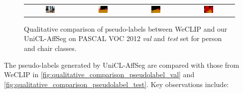 \begin{figure}[ht]
\begin{tcolorbox}[colframe=black!60, colback=white, boxrule=0.8pt, arc=2pt, left=2pt, right=2pt, top=2pt, bottom=2pt]
\begin{tabular}{cccc}
      
      \includegraphics[width=0.20\textwidth,height=0.20\textwidth]
      {figures/person_and_chair/originals/2008_003477}
                &
      \includegraphics[width=0.20\textwidth,height=0.20\textwidth]
      {figures/person_and_chair/gt/2008_003477}
                &
      \includegraphics[width=0.20\textwidth,height=0.20\textwidth]
      {figures/person_and_chair/weclip/2008_003477_[8, 10]}
                &
      \includegraphics[width=0.20\textwidth,height=0.20\textwidth]
      {figures/person_and_chair/ours/2008_003477_[8, 10]}    \\


    \end{tabular}

    \caption{Qualitative comparison of pseudo-labels between WeCLIP and our UniCL-AffSeg on PASCAL VOC 2012 \textit{val} and \textit{test} set for person and chair classes.}
    \label{fig:qualitative_comparison_pseudolabel_person_chair}
  \end{tcolorbox}
\end{figure}

The pseudo-labels generated by UniCL-AffSeg are compared with those from WeCLIP in \autoref{fig:qualitative_comparison_pseudolabel_val} and \autoref{fig:qualitative_comparison_pseudolabel_test}. Key observations include:

